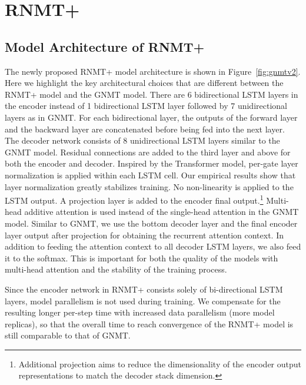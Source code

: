 \documentclass[11pt,a4paper]{article}
\begin{document}

\section{RNMT+}
\label{sec:v2}

\subsection{Model Architecture of RNMT+}
The newly proposed RNMT+ model architecture is shown in Figure~\ref{fig:gnmtv2}.
Here we highlight the key architectural choices that are different between
the RNMT+ model and the GNMT model.
There are 6 bidirectional LSTM layers in
the encoder instead of 1 bidirectional LSTM layer followed by 7 unidirectional
layers as in GNMT. For each
bidirectional layer, the outputs of the forward layer and the backward layer
are concatenated before being fed into the next layer.
The decoder network consists of 8 unidirectional LSTM layers similar to the
GNMT model.
Residual connections are
added to the third layer and above for both the encoder and decoder. Inspired by
the Transformer model, per-gate
layer normalization \cite{DBLP:journals/corr/BaKH16} is applied within each LSTM cell. Our empirical results
show that layer normalization greatly stabilizes training. No non-linearity is
applied to the LSTM output.  A projection layer is added to the encoder final
output.\footnote{Additional projection aims to reduce the dimensionality of
the encoder output representations to match the decoder stack dimension.}
Multi-head additive attention is used instead of the single-head
attention in the GNMT model. Similar to GNMT, we use the bottom decoder layer
and the final encoder layer output after projection for obtaining the recurrent
attention context. In addition to feeding the attention context to all decoder
LSTM layers, we also feed it to the softmax.
This is important for both the
quality of the models with multi-head attention and the stability of the
training process.

Since the encoder network in RNMT+ consists solely of bi-directional LSTM
layers, model parallelism is not used during training. We compensate for
the resulting longer per-step time with increased data parallelism
(more model replicas), so that the overall time to reach
convergence of the RNMT+ model is still comparable to that of GNMT.
\end{document}
